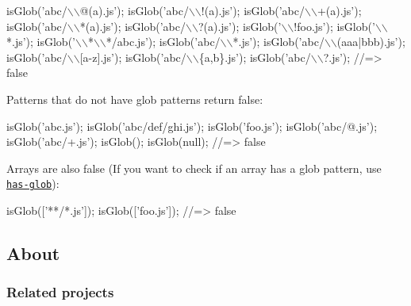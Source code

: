 \begin{DoxyCode}
isGlob('abc/\(\backslash\)\(\backslash\)@(a).js');
isGlob('abc/\(\backslash\)\(\backslash\)!(a).js');
isGlob('abc/\(\backslash\)\(\backslash\)+(a).js');
isGlob('abc/\(\backslash\)\(\backslash\)*(a).js');
isGlob('abc/\(\backslash\)\(\backslash\)?(a).js');
isGlob('\(\backslash\)\(\backslash\)!foo.js');
isGlob('\(\backslash\)\(\backslash\)*.js');
isGlob('\(\backslash\)\(\backslash\)*\(\backslash\)\(\backslash\)*/abc.js');
isGlob('abc/\(\backslash\)\(\backslash\)*.js');
isGlob('abc/\(\backslash\)\(\backslash\)(aaa|bbb).js');
isGlob('abc/\(\backslash\)\(\backslash\)[a-z].js');
isGlob('abc/\(\backslash\)\(\backslash\)\{a,b\}.js');
isGlob('abc/\(\backslash\)\(\backslash\)?.js');
//=> false
\end{DoxyCode}


Patterns that do not have glob patterns return {\ttfamily false}\+:


\begin{DoxyCode}
isGlob('abc.js');
isGlob('abc/def/ghi.js');
isGlob('foo.js');
isGlob('abc/@.js');
isGlob('abc/+.js');
isGlob();
isGlob(null);
//=> false
\end{DoxyCode}


Arrays are also {\ttfamily false} (If you want to check if an array has a glob pattern, use \href{https://github.com/jonschlinkert/has-glob}{\tt has-\/glob})\+:


\begin{DoxyCode}
isGlob(['**/*.js']);
isGlob(['foo.js']);
//=> false
\end{DoxyCode}


\subsection*{About}

\subsubsection*{Related projects}


